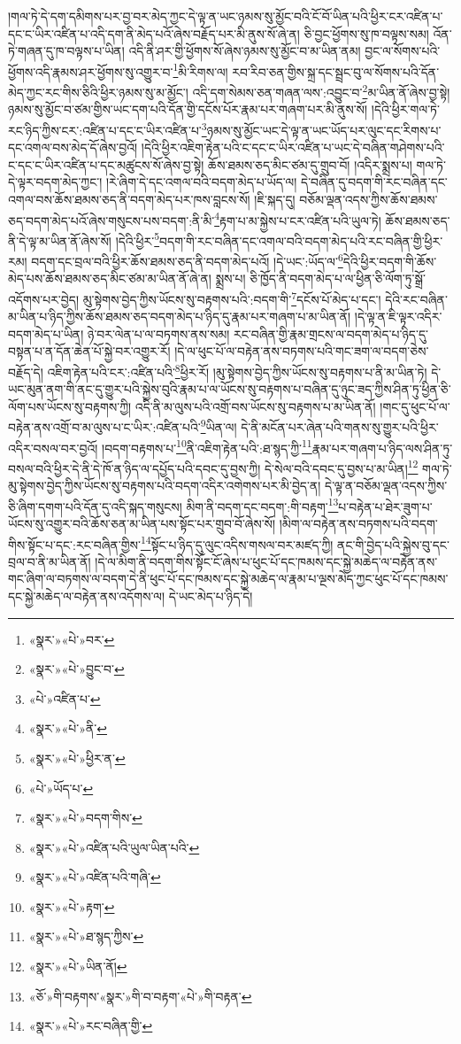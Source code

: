 །གལ་ཏེ་དེ་དག་དམིགས་པར་བྱ་བར་མེད་ཀྱང་དེ་ལྟ་ན་ཡང་ཉམས་སུ་མྱོང་བའི་ངོ་བོ་ཡིན་པའི་ཕྱིར་ངར་འཛིན་པ་དང་ང་ཡིར་འཛིན་པ་འདི་དག་ནི་མེད་པའོ་ཞེས་བརྗོད་པར་མི་ནུས་སོ་ཞེ་ན། ཅི་བྱང་ཕྱོགས་སུ་ཁ་བལྟས་སམ། འོན་ཏེ་གཞན་དུ་ཁ་བལྟས་པ་ཡིན། འདི་ནི་ཤར་གྱི་ཕྱོགས་སོ་ཞེས་ཉམས་སུ་མྱོང་བ་མ་ཡིན་ནམ། བྱང་ལ་སོགས་པའི་ཕྱོགས་འདི་རྣམས་ཤར་ཕྱོགས་སུ་འགྱུར་བ་\footnote{«སྣར་»«པེ་»བར་}མི་རིགས་ལ། རབ་རིབ་ཅན་གྱིས་སྐྲ་དང་སྦྲང་བུ་ལ་སོགས་པའི་དོན་མེད་ཀྱང་རང་གིས་ཅིའི་ཕྱིར་ཉམས་སུ་མ་མྱོང་། འདི་དག་སེམས་ཅན་གཞན་ལས་:འབྱུང་བ་\footnote{«སྣར་»«པེ་»བྱུང་བ་}མ་ཡིན་ནོ་ཞེས་བྱ་སྟེ། ཉམས་སུ་མྱོང་བ་ཙམ་གྱིས་ཡང་དག་པའི་དོན་གྱི་དངོས་པོར་རྣམ་པར་གཞག་པར་མི་ནུས་སོ། །དེའི་ཕྱིར་གལ་ཏེ་རང་ཉིད་ཀྱིས་ངར་:འཛིན་པ་དང་ང་ཡིར་འཛིན་པ་\footnote{«པེ་»འཛིན་པ་}ཉམས་སུ་མྱོང་ཡང་དེ་ལྟ་ན་ཡང་ཡོད་པར་ལུང་དང་རིགས་པ་དང་འགལ་བས་མེད་དོ་ཞེས་བྱའོ། །དེའི་ཕྱིར་འཇིག་རྟེན་པའི་ང་དང་ང་ཡིར་འཛིན་པ་ཡང་དེ་བཞིན་གཤེགས་པའི་ང་དང་ང་ཡིར་འཛིན་པ་དང་མཚུངས་སོ་ཞེས་བྱ་སྟེ། ཆོས་ཐམས་ཅད་མིང་ཙམ་དུ་གྲུབ་བོ། །འདིར་སྨྲས་པ། གལ་ཏེ་དེ་ལྟར་བདག་མེད་ཀྱང་། །རེ་ཞིག་དེ་དང་འགལ་བའི་བདག་མེད་པ་ཡོད་ལ། དེ་བཞིན་དུ་བདག་གི་རང་བཞིན་དང་འགལ་བས་ཆོས་ཐམས་ཅད་ནི་བདག་མེད་པར་ཁས་བླངས་སོ། །ཇི་སྐད་དུ། བཅོམ་ལྡན་འདས་ཀྱིས་ཆོས་ཐམས་ཅད་བདག་མེད་པའོ་ཞེས་གསུངས་པས་བདག་:ནི་མི་\footnote{«སྣར་»«པེ་»ནི་}རྟག་པ་མ་སྐྱེས་པ་ངར་འཛིན་པའི་ཡུལ་ཏེ། ཆོས་ཐམས་ཅད་ནི་དེ་ལྟ་མ་ཡིན་ནོ་ཞེས་སོ། །དེའི་ཕྱིར་\footnote{«སྣར་»«པེ་»ཕྱིར་ན་}བདག་གི་རང་བཞིན་དང་འགལ་བའི་བདག་མེད་པའི་རང་བཞིན་གྱི་ཕྱིར་རམ། བདག་དང་བྲལ་བའི་ཕྱིར་ཆོས་ཐམས་ཅད་ནི་བདག་མེད་པའོ། །དེ་ཡང་:ཡོད་ལ་\footnote{«པེ་»ཡོད་པ་}དེའི་ཕྱིར་བདག་གི་ཆོས་མེད་པས་ཆོས་ཐམས་ཅད་མིང་ཙམ་མ་ཡིན་ནོ་ཞེ་ན། སྨྲས་པ། ཅི་ཁྱོད་ནི་བདག་མེད་པ་ལ་ཕྱིན་ཅི་ལོག་ཏུ་སྒྲོ་འདོགས་པར་བྱེད། མུ་སྟེགས་བྱེད་ཀྱིས་ཡོངས་སུ་བརྟགས་པའི་:བདག་གི་\footnote{«སྣར་»«པེ་»བདག་གིས་}དངོས་པོ་མེད་པ་དང་། དེའི་རང་བཞིན་མ་ཡིན་པ་ཉིད་ཀྱིས་ཆོས་ཐམས་ཅད་བདག་མེད་པ་ཉིད་དུ་རྣམ་པར་གཞག་པ་མ་ཡིན་ནོ། །དེ་ལྟ་ན་ཇི་ལྟར་འདིར་བདག་མེད་པ་ཡིན། ཉེ་བར་ལེན་པ་ལ་བཏགས་ནས་སམ། རང་བཞིན་གྱི་རྣམ་གྲངས་ལ་བདག་མེད་པ་ཉིད་དུ་བསྟན་པ་ན་དོན་ཆེན་པོ་སྐྱེ་བར་འགྱུར་རོ། །དེ་ལ་ཕུང་པོ་ལ་བརྟེན་ནས་བཏགས་པའི་གང་ཟག་ལ་བདག་ཅེས་བརྗོད་དེ། འཇིག་རྟེན་པའི་ངར་:འཛིན་པའི་\footnote{«སྣར་»«པེ་»འཛིན་པའི་ཡུལ་ཡིན་པའི་}ཕྱིར་རོ། །མུ་སྟེགས་བྱེད་ཀྱིས་ཡོངས་སུ་བརྟགས་པ་ནི་མ་ཡིན་ཏེ། དེ་ཡང་མུན་ནག་གི་ནང་དུ་གྱུར་པའི་སྐྱེས་བུའི་རྣམ་པ་ལ་ཡོངས་སུ་བརྟགས་པ་བཞིན་དུ་ཉུང་ཟད་ཀྱིས་ཤིན་ཏུ་ཕྱིན་ཅི་ལོག་པས་ཡོངས་སུ་བརྟགས་ཀྱི། འདི་ནི་མ་ལུས་པའི་འགྲོ་བས་ཡོངས་སུ་བརྟགས་པ་མ་ཡིན་ནོ། །གང་དུ་ཕུང་པོ་ལ་བརྟེན་ནས་འགྲོ་བ་མ་ལུས་པ་ང་ཡིར་:འཛིན་པའི་\footnote{«སྣར་»«པེ་»འཛིན་པའི་གཞི་}ཡིན་ལ། དེ་ནི་མངོན་པར་ཞེན་པའི་གནས་སུ་གྱུར་པའི་ཕྱིར་འདིར་བསལ་བར་བྱའོ། །བདག་བརྟགས་པ་\footnote{«སྣར་»«པེ་»རྟག་}ནི་འཇིག་རྟེན་པའི་:ཐ་སྙད་ཀྱི་\footnote{«སྣར་»«པེ་»ཐ་སྙད་ཀྱིས་}རྣམ་པར་གཞག་པ་ཉིད་ལས་ཤིན་ཏུ་བསལ་བའི་ཕྱིར་དེ་ནི་དེ་ཁོ་ན་ཉིད་ལ་དཔྱོད་པའི་དབང་དུ་བྱས་ཀྱི། དེ་སེལ་བའི་དབང་དུ་བྱས་པ་མ་ཡིན།\footnote{«སྣར་»«པེ་»ཡིན་ནོ།} གལ་ཏེ་མུ་སྟེགས་བྱེད་ཀྱིས་ཡོངས་སུ་བརྟགས་པའི་བདག་འདིར་འགེགས་པར་མི་བྱེད་ན། དེ་ལྟ་ན་བཅོམ་ལྡན་འདས་ཀྱིས་ཅི་ཞིག་དགག་པའི་དོན་དུ་འདི་སྐད་གསུངས། མིག་ནི་བདག་དང་བདག་:གི་བརྟག་\footnote{«ཅོ་»གི་བརྟགས་«སྣར་»གི་བ་བརྟག་«པེ་»གི་བརྟན་}པ་བརྟེན་པ་ཐེར་ཟུག་པ་ཡོངས་སུ་འགྱུར་བའི་ཆོས་ཅན་མ་ཡིན་པས་སྟོང་པར་གྲུབ་བོ་ཞེས་སོ། །མིག་ལ་བརྟེན་ནས་བཏགས་པའི་བདག་གིས་སྟོང་པ་དང་:རང་བཞིན་གྱིས་\footnote{«སྣར་»«པེ་»རང་བཞིན་གྱི་}སྟོང་པ་ཉིད་དུ་ལུང་འདིས་གསལ་བར་མཛད་ཀྱི། ནང་གི་བྱེད་པའི་སྐྱེས་བུ་དང་བྲལ་བ་ནི་མ་ཡིན་ནོ། །དེ་ལ་མིག་ནི་བདག་གིས་སྟོང་ངོ་ཞེས་པ་ཕུང་པོ་དང་ཁམས་དང་སྐྱེ་མཆེད་ལ་བརྟེན་ནས་གང་ཞིག་ལ་བཏགས་ལ་བདག་དེ་ནི་ཕུང་པོ་དང་ཁམས་དང་སྐྱེ་མཆེད་ལ་རྣམ་པ་ལྔས་མེད་ཀྱང་ཕུང་པོ་དང་ཁམས་དང་སྐྱེ་མཆེད་ལ་བརྟེན་ནས་འདོགས་ལ། དེ་ཡང་མེད་པ་ཉིད་དེ། 